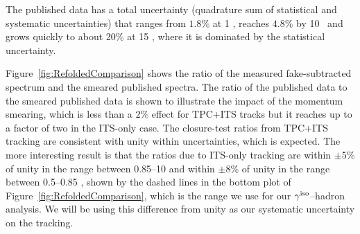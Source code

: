The published data has a total uncertainty (quadrature sum of statistical and systematic uncertainties) that ranges from $1.8\%$ at 1 \GeVc, reaches $4.8\%$ by 10 \GeVc~and grows quickly to about 20$\%$ at 15 \GeVc, where it is dominated by the statistical uncertainty. 

Figure~\ref{fig:RefoldedComparison} shows the ratio of the measured fake-subtracted spectrum and the smeared published spectra. The ratio of the published data to the smeared published data is shown to illustrate the impact of the momentum smearing, which is less than a $2\%$ effect for TPC+ITS tracks but it reaches up to a factor of two in the ITS-only case. The closure-test ratios from TPC+ITS tracking are consistent with unity within uncertainties, which is expected. The more interesting result is that the ratios due to ITS-only tracking are within $\pm$5\% of unity in the range between 0.85--10 \GeVc and within $\pm$8\% of unity in the range between 0.5--0.85 \GeVc, shown by the dashed lines in the bottom plot of Figure~\ref{fig:RefoldedComparison}, which is the range we use for our $\gamma^\mathrm{iso}$--hadron analysis. We will be using this difference from unity as our systematic uncertainty on the tracking.

